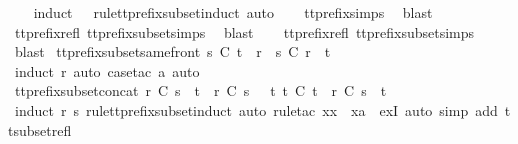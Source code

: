 \begin{isabellebody}
%
\isadelimproof
\ \ %
\endisadelimproof
%
\isatagproof
{}\isamarkupfalse%
\ {\isacharparenleft}induct\ {\isasymrho}\ {\isasymsigma}\ rule{\isacharcolon}tt{\isacharunderscore}prefix{\isacharunderscore}subset{\isachardot}induct{\isacharcomma}\ auto{\isacharparenright}\isanewline
\ \ \isamarkupfalse%
\ tt{\isacharunderscore}prefix{\isachardot}simps{\isacharparenleft}{}{\isacharparenright}\ \isamarkupfalse%
\ blast\isanewline
\ \ \isamarkupfalse%
\ tt{\isacharunderscore}prefix{\isacharunderscore}refl\ tt{\isacharunderscore}prefix{\isacharunderscore}subset{\isachardot}simps{\isacharparenleft}{}{\isacharparenright}\ \isamarkupfalse%
\ blast\isanewline
\ \ \isamarkupfalse%
\ tt{\isacharunderscore}prefix{\isacharunderscore}refl\ tt{\isacharunderscore}prefix{\isacharunderscore}subset{\isachardot}simps{\isacharparenleft}{}{\isacharparenright}\ \isamarkupfalse%
\ blast%
\endisatagproof
{\isafoldproof}%
%
\isadelimproof
\isanewline
%
\endisadelimproof
\isanewline
{}\isamarkupfalse%
\ tt{\isacharunderscore}prefix{\isacharunderscore}subset{\isacharunderscore}same{\isacharunderscore}front{\isacharcolon}\ {\isachardoublequoteopen}s\ {\isasymlesssim}\isactrlsub C\ t\ {\isacharequal}\ {\isacharparenleft}r\ {\isacharat}\ s\ {\isasymlesssim}\isactrlsub C\ r\ {\isacharat}\ t{\isacharparenright}{\isachardoublequoteclose}\isanewline
%
\isadelimproof
\ \ %
\endisadelimproof
%
\isatagproof
{}\isamarkupfalse%
\ {\isacharparenleft}induct\ r{\isacharcomma}\ auto{\isacharcomma}\ {\isacharparenleft}case{\isacharunderscore}tac\ a{\isacharcomma}\ auto{\isacharparenright}{\isacharplus}{\isacharparenright}%
\endisatagproof
{\isafoldproof}%
%
\isadelimproof
\isanewline
%
\endisadelimproof
\isanewline
{}\isamarkupfalse%
\ tt{\isacharunderscore}prefix{\isacharunderscore}subset{\isacharunderscore}concat{\isacharcolon}\ {\isachardoublequoteopen}r\ {\isasymlesssim}\isactrlsub C\ s\ {\isacharat}\ t\ {\isasymLongrightarrow}\ r\ {\isasymlesssim}\isactrlsub C\ s\ {\isasymor}\ {\isacharparenleft}{\isasymexists}\ t{\isacharprime}{\isachardot}\ t{\isacharprime}\ {\isasymlesssim}\isactrlsub C\ t\ {\isasymand}\ r\ {\isasymsubseteq}\isactrlsub C\ s\ {\isacharat}\ t{\isacharprime}{\isacharparenright}{\isachardoublequoteclose}\isanewline
%
\isadelimproof
\ \ %
\endisadelimproof
%
\isatagproof
{}\isamarkupfalse%
\ {\isacharparenleft}induct\ r\ s\ rule{\isacharcolon}tt{\isacharunderscore}prefix{\isacharunderscore}subset{\isachardot}induct{\isacharcomma}\ auto{\isacharcomma}\ rule{\isacharunderscore}tac\ x{\isacharequal}{\isachardoublequoteopen}x\ {\isacharhash}\ xa{\isachardoublequoteclose}\ \ exI{\isacharcomma}\ auto\ simp\ add{\isacharcolon}\ tt{\isacharunderscore}subset{\isacharunderscore}refl{\isacharparenright}%

\end{isabellebody}

